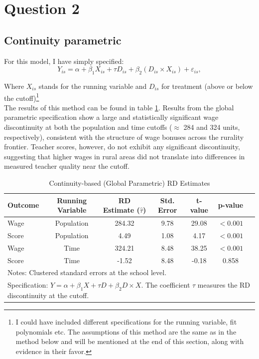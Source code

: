 \documentclass{article}
\begin{document}
\section*{Question 2}

\subsection*{Continuity parametric}

For this model, I have simply specified:
\begin{equation}
Y_{is} = \alpha + \beta_1 X_{is} + \tau D_{is} + \beta_2 (D_{is} \times X_{is}) + \varepsilon_{is},
\label{eq:global_rd}
\end{equation}

Where $X_{is}$ stands for the running variable and $D_{is}$ for treatment (above or below the cutoff)\footnote{I could have included different specifications for the running variable, fit polynomials etc. The assumptions of this method are the same as in the method below and will be mentioned at the end of this section, along with evidence in their favor.} \\

The results of this method can be found in table \ref{tab:global_rd}. 
Results from the global parametric specification show a large and statistically significant wage discontinuity at both the population and time cutoffs ($\approx$ 284 and 324 units, respectively), consistent with the structure of wage bonuses across the rurality frontier. Teacher scores, however, do not exhibit any significant discontinuity, suggesting that higher wages in rural areas did not translate into differences in measured teacher quality near the cutoff.

\begin{table}[H]
\centering
\caption{Continuity-based (Global Parametric) RD Estimates}
\label{tab:global_rd}
\begin{tabular}{lcccccc}
\hline
Outcome & Running Variable & RD Estimate ($\hat{\tau}$) & Std. Error & t-value & p-value  \\
\hline
Wage   & Population & 284.32 & 9.78 & 29.08 & $<0.001$  \\
Score  & Population & 4.49   & 1.08 & 4.17  & $<0.001$  \\
Wage   & Time       & 324.21 & 8.48 & 38.25 & $<0.001$  \\
Score  & Time       & -1.52  & 8.48 & -0.18 & 0.858   \\
\hline
\multicolumn{7}{l}{\footnotesize Notes: Clustered standard errors at the school level.} \\
\multicolumn{7}{l}{\footnotesize Specification: $Y = \alpha + \beta_1 X + \tau D + \beta_2 D\times X$. The coefficient $\tau$ measures the RD discontinuity at the cutoff.}\\
\end{tabular}
\end{table}
\end{document}
